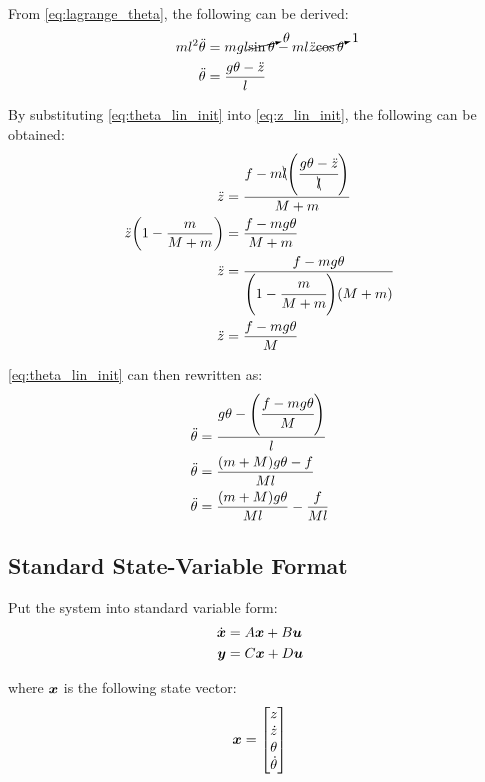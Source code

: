 \documentclass[]{article}
\begin{document}
			From \eqref{eq:lagrange_theta}, the following can be derived:
			\begin{align}
				m l^2 \ddot{\theta} &= m g l \cancelto{\theta}{\sin{\theta}} - m l \ddot{z} \cancelto{1}{\cos{\theta}} \nonumber\\
				\ddot{\theta} &= \frac{g\theta -\ddot{z}}{l} \label{eq:theta_lin_init}
			\end{align}
			
			By substituting \eqref{eq:theta_lin_init} into \eqref{eq:z_lin_init}, the following can be obtained:
			\begin{align}
				\ddot{z} &= \frac{f -m\bcancel{l} \qty(\cfrac{g\theta-\ddot{z}}{\bcancel{l}})}{M+m} \nonumber\\
				\ddot{z} \qty(1-\frac{m}{M+m}) &= \frac{f - mg\theta}{M+m} \nonumber\\
				\ddot{z} &= \frac{f-mg\theta}{\qty(1-\cfrac{m}{M+m}) \qty(M+m)} \nonumber\\
				\ddot{z} &= \frac{f-mg\theta}{M} \label{eq:z_lin}
			\end{align}
			
			\eqref{eq:theta_lin_init} can then rewritten as:
			\begin{align}
				\ddot{\theta} &= \frac{g\theta -\qty(\cfrac{f-mg\theta}{M})}{l} \nonumber\\
				\ddot{\theta} &= \frac{(m+M)g\theta - f}{Ml} \nonumber\\
				\ddot{\theta} &= \frac{(m+M)g\theta}{Ml} - \frac{f}{Ml} \label{eq:theta_lin}
			\end{align}

	\subsection{Standard State-Variable Format}
		Put the system into standard variable form:
		\begin{equation}
			\begin{aligned}
				\dot{\vb*{x}} &= A \vb*{x} + B \vb*{u}\\
				\vb*{y} &= C \vb*{x} + D \vb*{u}
			\end{aligned} \label{eq:state_eq_def}
		\end{equation}
		
		where $\vb*{x}$ is the following state vector:
		\begin{equation}
			\vb*{x} = \mqty[z \\ \dot{z} \\ \theta \\ \dot{\theta}] \label{eq:state_var}
		\end{equation}
	
\end{document}

